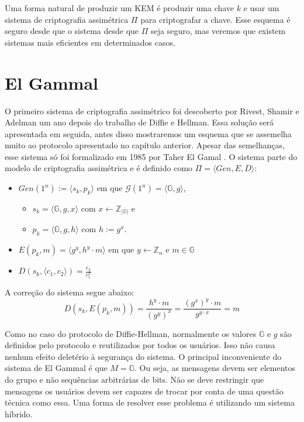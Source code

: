 Uma forma natural de produzir um KEM é produzir uma chave $k$ e usar um sistema de criptografia assimétrica $\Pi$ para criptografar a chave.
Esse esquema é seguro desde que o sistema desde que $\Pi$ seja seguro, mas veremos que existem sistemas mais eficientes em determinados casos.


\section{El Gammal}
\label{sec:el-gammal}
O primeiro sistema de criptografia assimétrico foi descoberto por Rivest, Shamir e Adelman um ano depois do trabalho de Diffie e Hellman.
Essa solução será apresentada em seguida, antes disso mostraremos um esquema que se assemelha muito ao protocolo apresentado no capítulo anterior.
Apesar das semelhanças, esse sistema só foi formalizado em 1985 por Taher El Gamal \cite{ElGamal85}.
O sistema parte do modelo de criptografia assimétrica e é definido como $\Pi= \langle Gen, E, D\rangle$:
\begin{itemize}
\item $Gen(1^n) := \langle s_k, p_k \rangle$ em que $\mathcal{G}(1^n) = \langle \mathbb{G}, g \rangle$,
\begin{itemize}
\item  $s_k = \langle \mathbb{G}, g, x \rangle$ com $x \leftarrow \mathbb{Z}_{|\mathbb{G}|}$ e
\item  $p_k = \langle \mathbb{G}, g, h \rangle$ com $h := g^x$.
\end{itemize}

\item $E(p_k, m) = \langle g^y, h^y \cdot m\rangle$ em que $y \leftarrow \mathbb{Z}_n$ e $m \in \mathbb{G}$
\item $D(s_k, \langle c_1, c_2 \rangle) = \frac{c_2}{c_1^x}$
\end{itemize}

A correção do sistema segue abaixo:
\begin{displaymath}
  D(s_k, E(p_k, m)) =  \frac{h^y \cdot m}{(g^y)^x} = \frac{(g^x)^y \cdot m}{g^{y \cdot x}} = m 
\end{displaymath}

Como no caso do protocolo de Diffie-Hellman, normalmente os valores $\mathbb{G}$ e $g$ são definidos pelo protocolo e reutilizados por todos os usuários.
Isso não causa nenhum efeito deletério à segurança do sistema.
O principal inconveniente do sistema de El Gammal é que $M = \mathbb{G}$.
Ou seja, as mensagens devem ser elementos do grupo e não sequências arbitrárias de bits.
Não se deve restringir que mensagens os usuários devem ser capazes de trocar por conta de uma questão técnica como essa.
Uma forma de resolver esse problema é utilizando um sistema híbrido.

